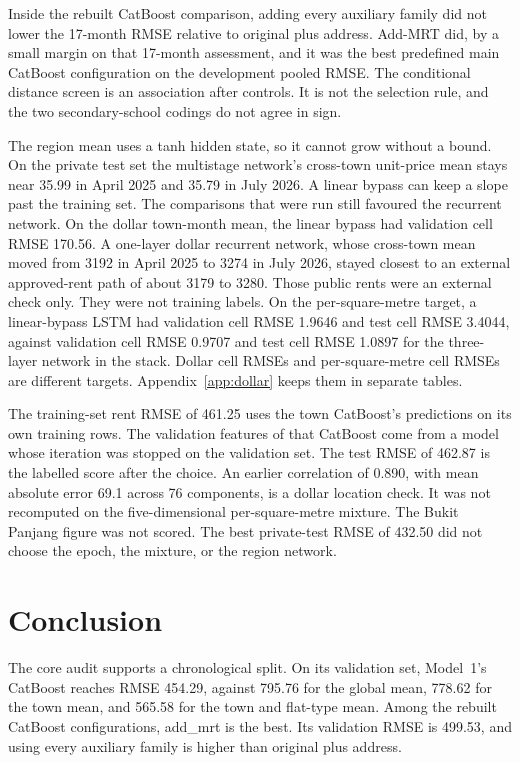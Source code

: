 \documentclass[11pt,a4paper]{article}
\begin{document}
Inside the rebuilt CatBoost comparison, adding every auxiliary family did not lower the 17-month RMSE relative to original plus address.
Add-MRT did, by a small margin on that 17-month assessment, and it was the best predefined main CatBoost configuration on the development pooled RMSE.
The conditional distance screen is an association after controls.
It is not the selection rule, and the two secondary-school codings do not agree in sign.

The region mean uses a tanh hidden state, so it cannot grow without a bound.
On the private test set the multistage network's cross-town unit-price mean stays near 35.99 in April 2025 and 35.79 in July 2026.
A linear bypass can keep a slope past the training set.
The comparisons that were run still favoured the recurrent network.
On the dollar town-month mean, the linear bypass had validation cell RMSE 170.56.
A one-layer dollar recurrent network, whose cross-town mean moved from 3192 in April 2025 to 3274 in July 2026, stayed closest to an external approved-rent path of about 3179 to 3280.
Those public rents were an external check only.
They were not training labels.
On the per-square-metre target, a linear-bypass LSTM had validation cell RMSE 1.9646 and test cell RMSE 3.4044, against validation cell RMSE 0.9707 and test cell RMSE 1.0897 for the three-layer network in the stack.
Dollar cell RMSEs and per-square-metre cell RMSEs are different targets.
Appendix~\ref{app:dollar} keeps them in separate tables.

The training-set rent RMSE of 461.25 uses the town CatBoost's predictions on its own training rows.
The validation features of that CatBoost come from a model whose iteration was stopped on the validation set.
The test RMSE of 462.87 is the labelled score after the choice.
An earlier correlation of 0.890, with mean absolute error 69.1 across 76 components, is a dollar location check.
It was not recomputed on the five-dimensional per-square-metre mixture.
The Bukit Panjang figure was not scored.
The best private-test RMSE of 432.50 did not choose the epoch, the mixture, or the region network.

\FloatBarrier
\section{Conclusion}
\label{sec:conclusion}

The core audit supports a chronological split.
On its validation set, Model~1's CatBoost reaches RMSE 454.29, against 795.76 for the global mean, 778.62 for the town mean, and 565.58 for the town and flat-type mean.
Among the rebuilt CatBoost configurations, add\_mrt is the best.
Its validation RMSE is 499.53, and using every auxiliary family is higher than original plus address.
\end{document}
